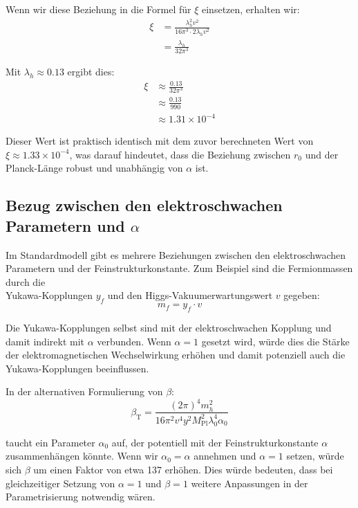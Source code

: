 \documentclass[12pt,a4paper]{article}
\newcommand{\betaT}{\beta_{\text{T}}}
\newcommand{\Mpl}{M_{\text{Pl}}}
\begin{document}
	Wenn wir diese Beziehung in die Formel für \(\xi\) einsetzen, erhalten wir:
	\begin{align}
		\xi &= \frac{\lambda_h^2 v^2}{16\pi^3 \cdot 2\lambda_h v^2} \\
		&= \frac{\lambda_h}{32\pi^3}
	\end{align}
	
	Mit \(\lambda_h \approx 0.13\) ergibt dies:
	\begin{align}
		\xi &\approx \frac{0.13}{32\pi^3} \\
		&\approx \frac{0.13}{990} \\
		&\approx 1.31 \times 10^{-4}
	\end{align}
	
	Dieser Wert ist praktisch identisch mit dem zuvor berechneten Wert von \(\xi \approx 1.33 \times 10^{-4}\), was darauf hindeutet, dass die Beziehung zwischen \(r_0\) und der Planck-Länge robust und unabhängig von \(\alpha\) ist.
	
	\subsection{Bezug zwischen den elektroschwachen Parametern und \(\alpha\)}
	
	Im Standardmodell gibt es mehrere Beziehungen zwischen den elektroschwachen Parametern und der Feinstrukturkonstante. Zum Beispiel sind die Fermionmassen durch die \\ Yukawa-Kopplungen \(y_f\) und den Higgs-Vakuumerwartungswert \(v\) gegeben:
	\begin{equation}
		m_f = y_f \cdot v
	\end{equation}
	
	Die Yukawa-Kopplungen selbst sind mit der elektroschwachen Kopplung und damit indirekt mit \(\alpha\) verbunden. Wenn \(\alpha = 1\) gesetzt wird, würde dies die Stärke der elektromagnetischen Wechselwirkung erhöhen und damit potenziell auch die Yukawa-Kopplungen beeinflussen.
	
	In der alternativen Formulierung von \(\beta\):
	\begin{equation}
		\betaT = \frac{(2\pi)^4 m_h^2}{16 \pi^2 v^4 y^2 \Mpl^2 \lambda_0^4 \alpha_0}
	\end{equation}
	
	taucht ein Parameter \(\alpha_0\) auf, der potentiell mit der Feinstrukturkonstante \(\alpha\) zusammenhängen könnte. Wenn wir \(\alpha_0 = \alpha\) annehmen und \(\alpha = 1\) setzen, würde sich \(\beta\) um einen Faktor von etwa 137 erhöhen. Dies würde bedeuten, dass bei gleichzeitiger Setzung von \(\alpha = 1\) und \(\beta = 1\) weitere Anpassungen in der Parametrisierung notwendig wären.
	
\end{document}
